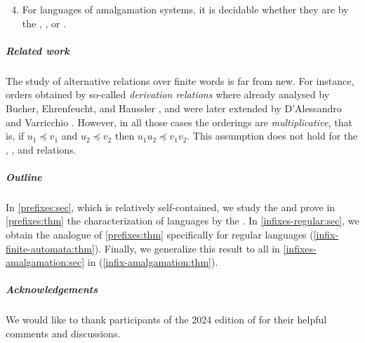 {
\renewcommand{\labelenumi}{R\arabic{enumi}}
\begin{enumerate}
	\setcounter{enumi}{3}
	\item For languages of amalgamation systems, it is decidable whether they are  by the , , or .
\end{enumerate}
}

\subparagraph{Related work} The study of alternative 
relations over finite words is far from new. For instance, orders obtained by
so-called \emph{derivation relations} where already analysed by Bucher,
Ehrenfeucht, and Haussler \cite{BUEUD85}, and were later extended by
D'Alessandro and Varricchio \cite{ALVA03,ALVA06}. However, in all those cases
the orderings are \emph{multiplicative}, that is, if $u_1 \preceq v_1$ and $u_2
\preceq v_2$ then $u_1u_2 \preceq v_1v_2$. This assumption does not hold for
the , , and  relations.

\subparagraph{Outline} In \cref{prefixes:sec}, which is relatively
self-contained, we study the  and prove in \cref{prefixes:thm}
the characterization of  languages by the . In \cref{infixes-regular:sec}, we obtain the  analogue of
\cref{prefixes:thm} specifically for regular languages
(\cref{infix-finite-automata:thm}). Finally, we generalize this result to all 
 in \cref{infixes-amalgamation:sec} in 
(\cref{infix-amalgamation:thm}).

\subparagraph{Acknowledgements} We would like to thank participants of the 2024
edition of  for their helpful comments and discussions.
